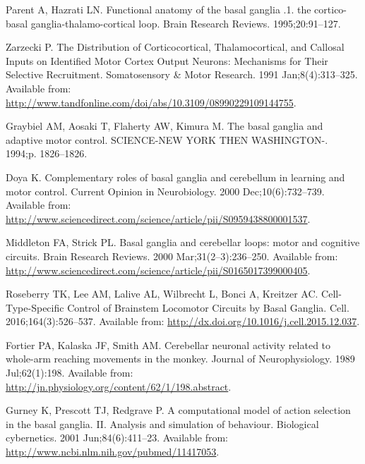 \documentclass[10pt,letterpaper]{article}
\begin{document}
\begin{thebibliography}{10}
Parent A, Hazrati LN.
\newblock Functional anatomy of the basal ganglia .1. the cortico-basal
  ganglia-thalamo-cortical loop.
\newblock Brain Research Reviews. 1995;20:91--127.

Zarzecki P.
\newblock The {Distribution} of {Corticocortical}, {Thalamocortical}, and
  {Callosal} {Inputs} on {Identified} {Motor} {Cortex} {Output} {Neurons}:
  {Mechanisms} for {Their} {Selective} {Recruitment}.
\newblock Somatosensory \& Motor Research. 1991 Jan;8(4):313--325.
\newblock Available from:
  \url{http://www.tandfonline.com/doi/abs/10.3109/08990229109144755}.

Graybiel AM, Aosaki T, Flaherty AW, Kimura M.
\newblock The basal ganglia and adaptive motor control.
\newblock SCIENCE-NEW YORK THEN WASHINGTON-. 1994;p. 1826--1826.

Doya K.
\newblock Complementary roles of basal ganglia and cerebellum in learning and
  motor control.
\newblock Current Opinion in Neurobiology. 2000 Dec;10(6):732--739.
\newblock Available from:
  \url{http://www.sciencedirect.com/science/article/pii/S0959438800001537}.

Middleton FA, Strick PL.
\newblock Basal ganglia and cerebellar loops: motor and cognitive circuits.
\newblock Brain Research Reviews. 2000 Mar;31(2–3):236--250.
\newblock Available from:
  \url{http://www.sciencedirect.com/science/article/pii/S0165017399000405}.

Roseberry TK, Lee AM, Lalive AL, Wilbrecht L, Bonci A, Kreitzer AC.
\newblock Cell-{Type}-{Specific} {Control} of {Brainstem} {Locomotor}
  {Circuits} by {Basal} {Ganglia}.
\newblock Cell. 2016;164(3):526--537.
\newblock Available from: \url{http://dx.doi.org/10.1016/j.cell.2015.12.037}.

Fortier PA, Kalaska JF, Smith AM.
\newblock Cerebellar neuronal activity related to whole-arm reaching movements
  in the monkey.
\newblock Journal of Neurophysiology. 1989 Jul;62(1):198.
\newblock Available from:
  \url{http://jn.physiology.org/content/62/1/198.abstract}.

Gurney K, Prescott TJ, Redgrave P.
\newblock A computational model of action selection in the basal ganglia. {II}.
  {Analysis} and simulation of behaviour.
\newblock Biological cybernetics. 2001 Jun;84(6):411--23.
\newblock Available from: \url{http://www.ncbi.nlm.nih.gov/pubmed/11417053}.


\end{thebibliography}
\end{document}

